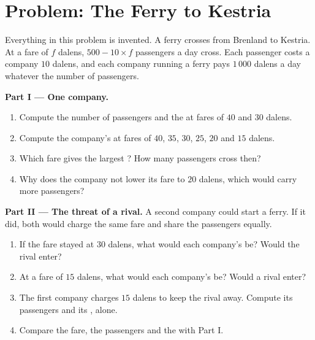 \section{Problem: The Ferry to Kestria}

\begin{problem}
\label{pb:g8:competition-and-monopoly-first-look:1}
Everything in this problem is invented. A ferry crosses from Brenland to Kestria. At a fare of $f$
dalens, $500 - 10 \times f$ passengers a day cross. Each passenger costs a company $10$ dalens, and
each company running a ferry pays $1\,000$ dalens a day whatever the number of passengers.

\medskip
\noindent\textbf{Part I --- One company.}
\begin{enumerate}
  \item Compute the number of passengers and the  at fares of $40$ and $30$ dalens.
  \item Compute the company's  at fares of $40$, $35$, $30$, $25$, $20$ and $15$ dalens.
  \item Which fare gives the largest ? How many passengers cross then?
  \item Why does the company not lower its fare to $20$ dalens, which would carry more passengers?
\end{enumerate}

\medskip
\noindent\textbf{Part II --- The threat of a rival.} A second company could start a ferry. If it did,
both would charge the same fare and share the passengers equally.
\begin{enumerate}[resume]
  \item If the fare stayed at $30$ dalens, what would each company's  be? Would the rival enter?
  \item At a fare of $15$ dalens, what would each company's  be? Would a rival enter?
  \item The first company charges $15$ dalens to keep the rival away. Compute its passengers and its
        , alone.
  \item Compare the fare, the passengers and the  with Part I.
\end{enumerate}


\end{problem}
